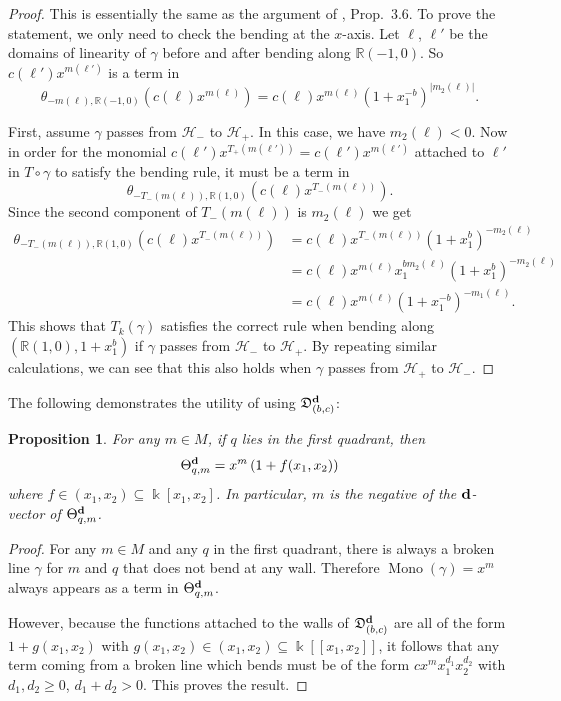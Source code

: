\documentclass[11pt]{amsart}
\newtheorem{prop}[theorem]{Proposition}
\theoremstyle{remark}
\numberwithin{equation}{section}
\newcommand{\RR}{\mathbb{R}}
\newcommand{\fD}{\mathfrak{D}}
\newcommand{\bfd}{{\bf d}}
\newcommand{\Mono}{\operatorname{Mono}}
\begin{document}
\begin{proof}
  This is essentially the same as the argument of \cite{GHKK}, Prop.\ 3.6.  To
  prove the statement, we only need to check the bending at the $x$-axis. Let
  $\ell$, $\ell'$ be the domains of linearity of $\gamma$ before and after bending
  along $\RR (-1,0)$. So $c(\ell') x^{m(\ell')}$ is a term in 
  \[
    \theta_{-m(\ell),\RR(-1,0)} \left(c(\ell) x^{m(\ell)}\right)
    = 
    c(\ell) x^{m(\ell)} \left(1+x_1^{-b}\right) ^{|m_2(\ell)|}.
  \]

  First, assume $\gamma$ passes from $\mathcal{H}_-$ to $\mathcal{H}_+$. In this
  case, we have $m_2(\ell) < 0$. Now in order for the monomial
  $c(\ell')x^{T_+(m(\ell'))} =c(\ell')x^{m(\ell')}$ attached to $\ell'$ in
  $T\circ\gamma$ to satisfy the bending rule, it must be a term in
  \[
    \theta_{-T_-(m(\ell)),\RR (1,0)} \left(c(\ell) x^{T_-(m(\ell))}\right). 
  \]
  Since the second component of $T_-(m(\ell))$ is $m_2(\ell)$ we get
  \begin{align*} 
    \theta_{-T_-(m(\ell)),\RR (1,0)} \left(c(\ell) x^{T_-(m(\ell))}\right) 
    & =
    c(\ell) x^{T_-(m(\ell))} \left(1+x_1^b\right) ^{-m_2(\ell)}
    \\
    & = 
    c(\ell) x^{m(\ell)} x_1^{b m_2(\ell)} 
    \left(1+x_1^b\right)^{-m_2(\ell)} 
    \\
    & = 
    c(\ell) x^{m(\ell)} \left(1+x_1^{-b}\right) ^{-m_1(\ell)}.
  \end{align*}
  This shows that $T_k(\gamma)$ satisfies the correct rule when bending along
  $(\RR (1,0), 1+x_1^b)$ if $\gamma$ passes from $\mathcal{H}_-$ to
  $\mathcal{H}_+$. By repeating similar calculations, we can see that this also
  holds when $\gamma$ passes from $\mathcal{H}_+$ to $\mathcal{H}_-$.
\end{proof}

The following demonstrates the utility of using $\fD_{(b,c)}^\bfd$:

\begin{prop}
  For any  $m\in M$, if $q$ lies in the first quadrant, then 
  \[
    \Theta^\bfd_{q, m}=x^{m}\left(1+f(x_1,x_2)\right)
  \]
  where $f\in (x_1,x_2)\subseteq \Bbbk[x_1,x_2]$.
  In particular, $m$ is the negative of the $\bfd$-vector of
  $\Theta^\bfd_{q,m}$.
\end{prop}

\begin{proof}
  For any $m\in M$ and any $q$ in the first quadrant, there is always a broken
  line $\gamma$ for $m$ and $q$ that does not bend at any wall. Therefore $\Mono
  (\gamma) = x^{m}$ always appears as a term in $\Theta^\bfd_{q,m}$.

  However, because the functions attached to the walls of
  $\fD_{(b,c)}^\bfd$ are all of the form $1+g(x_1,x_2)$ with $g(x_1,x_2) \in
  (x_1,x_2) \subseteq \Bbbk[[x_1,x_2]]$, it follows that any term coming from a
  broken line which bends must be of the form $cx^{m}x_1^{d_1}x_2^{d_2}$ with
  $d_1,d_2\ge 0$, $d_1+d_2>0$. This proves the result.
\end{proof}
\end{document}
